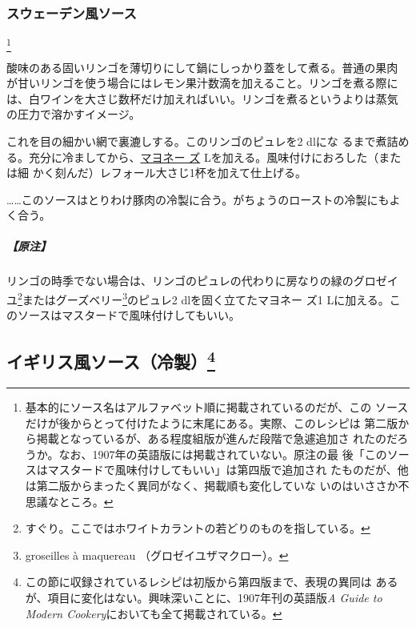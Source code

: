 \begin{recette}
\maeaki

\hypertarget{sauce-suedoise}{%
\subsubsection{スウェーデン風ソース}\label{sauce-suedoise}}

\footnote{基本的にソース名はアルファベット順に掲載されているのだが、この
  ソースだけが後からとって付けたように末尾にある。実際、このレシピは
  第二版から掲載となっているが、ある程度組版が進んだ段階で急遽追加さ
  れたのだろうか。なお、1907年の英語版には掲載されていない。原注の最
  後「このソースはマスタードで風味付けしてもいい」は第四版で追加され
  たものだが、他は第二版からまったく異同がなく、掲載順も変化していな
  いのはいささか不思議なところ。}


酸味のある固いリンゴを薄切りにして鍋にしっかり蓋をして煮る。普通の果肉
が甘いリンゴを使う場合にはレモン果汁数滴を加えること。リンゴを煮る際に
は、白ワインを大さじ数杯だけ加えればいい。リンゴを煮るというよりは蒸気
の圧力で溶かすイメージ。

これを目の細かい網で裏漉しする。このリンゴのピュレを2\undemi{} dlにな
るまで煮詰める。充分に冷ましてから、\protect\hyperlink{mayonnaise}{マヨネー
ズ}\troisquarts{} Lを加える。風味付けにおろした（または細
かく刻んだ）レフォール大さじ1\undemi{}杯を加えて仕上げる。

\ldots{}\ldots{}このソースはとりわけ豚肉の冷製に合う。がちょうのローストの冷製にもよく合う。

\hypertarget{nota-sauce-suedoise}{%
\subparagraph{【原注】}\label{nota-sauce-suedoise}}

リンゴの時季でない場合は、リンゴのピュレの代わりに房なりの緑のグロゼイ
ユ\footnote{すぐり。ここではホワイトカラントの若どりのものを指している。}またはグーズベリー\footnote{groseilles
  à maquereau （グロゼイユザマクロー）。}のピュレ2\undemi{}
dlを固く立てたマヨネー ズ1
Lに加える。このソースはマスタードで風味付けしてもいい。
\end{recette}
\newpage

\hypertarget{sauces-froides-anglaises}{%
\subsection[イギリス風ソース（冷製）]{\texorpdfstring{イギリス風ソース（冷製）\footnote{この節に収録されているレシピは初版から第四版まで、表現の異同は
  あるが、項目に変化はない。興味深いことに、1907年刊の英語版\emph{A
  Guide to Modern Cookery}においても全て掲載されている。}}{イギリス風ソース（冷製）}}\label{sauces-froides-anglaises}}

